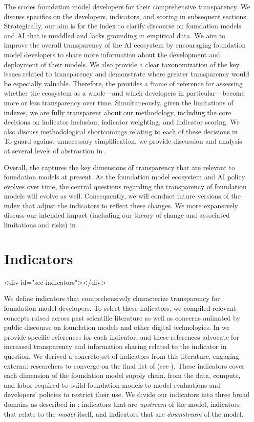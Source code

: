 \documentclass[screen, authorversion, acmsmall]{acmart}
\begin{document}
The \projectname scores foundation model developers for their comprehensive transparency. 
We discuss specifics on the developers, indicators, and scoring in subsequent sections.
Strategically, our aim is for the index to clarify discourse on foundation models and AI that is muddled and lacks grounding in empirical data. 
We aim to improve the overall transparency of the AI ecosystem by encouraging foundation model developers to share more information about the development and deployment of their models. 
We also provide a clear taxonomization of the key issues related to transparency and demonstrate where greater transparency would be especially valuable. 
Therefore, the \projectname provides a frame of reference for assessing whether the ecosystem as a whole---and which developers in particular---become more or less transparency over time.
Simultaneously, given the limitations of indexes, we are fully transparent about our methodology, including the core decisions on indicator inclusion, indicator weighting, and indicator scoring.
We also discuss methodological shortcomings relating to each of these decisions in .
To guard against unnecessary simplification, we provide discussion and analysis at several levels of abstraction in . 

Overall, the \projectname captures the key dimensions of transparency that are relevant to foundation models at present.
As the foundation model ecosystem and AI policy evolves over time, the central questions regarding the transparency of foundation models will evolve as well.
Consequently, we will conduct future versions of the index that adjust the indicators to reflect these changes.
We more expansively discuss our intended impact (including our theory of change and associated limitations and risks) in .
\clearpage
\hypertarget{indicators}{\section{Indicators}}
<div id="sec-indicators"></div>

We define \numindicators indicators that comprehensively characterize transparency for foundation model developers.
To select these indicators, we compiled relevant concepts raised across past scientific literature as well as concerns animated by public discourse on foundation models and other digital technologies. In  we provide specific references for each indicator, and these references advocate for increased transparency and information sharing related to the indicator in question.
We derived a concrete set of indicators from this literature, engaging external researchers to converge on the final list of \numindicators (see ).
These indicators cover each dimension of the foundation model supply chain, from the data, compute, and labor required to build foundation models to model evaluations and developers' policies to restrict their use. 
We divide our indicators into three broad domains as described in : indicators that are \textit{upstream} of the model, indicators that relate to the \textit{model} itself, and indicators that are \textit{downstream} of the model.
\end{document}
